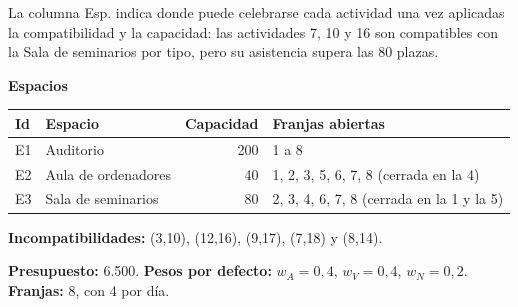 La columna Esp. indica donde puede celebrarse cada actividad una vez aplicadas la compatibilidad y la capacidad: las actividades 7, 10 y 16 son compatibles con la Sala de seminarios por tipo, pero su asistencia supera las 80 plazas.

\textbf{Espacios}

\begin{tabular}{@{}l l r l@{}}\toprule
Id & Espacio & Capacidad & Franjas abiertas\\\midrule
E1 & Auditorio & 200 & 1 a 8\\
E2 & Aula de ordenadores & 40 & 1, 2, 3, 5, 6, 7, 8 (cerrada en la 4)\\
E3 & Sala de seminarios & 80 & 2, 3, 4, 6, 7, 8 (cerrada en la 1 y la 5)\\\bottomrule
\end{tabular}

\textbf{Incompatibilidades:} (3,10), (12,16), (9,17), (7,18) y (8,14).

\textbf{Presupuesto:} 6.500. \textbf{Pesos por defecto:} $w_A=0{,}4$, $w_V=0{,}4$, $w_N=0{,}2$. \textbf{Franjas:} 8, con 4 por d\'ia.
